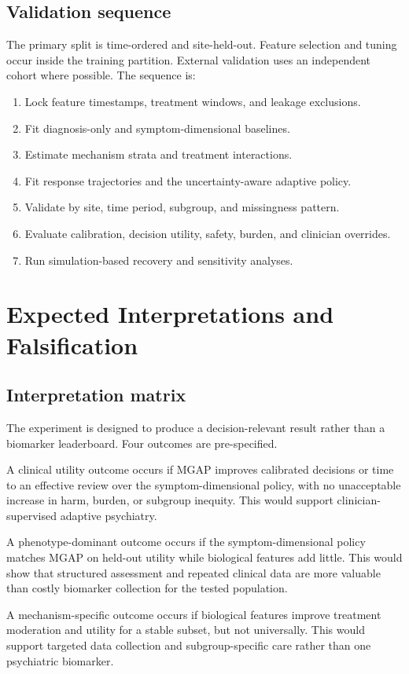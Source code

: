 \documentclass[conference]{IEEEtran}
\begin{document}
\subsection{Validation sequence}
The primary split is time-ordered and site-held-out. Feature selection and tuning occur inside the training partition. External validation uses an independent cohort where possible. The sequence is:
\begin{enumerate}
\item Lock feature timestamps, treatment windows, and leakage exclusions.
\item Fit diagnosis-only and symptom-dimensional baselines.
\item Estimate mechanism strata and treatment interactions.
\item Fit response trajectories and the uncertainty-aware adaptive policy.
\item Validate by site, time period, subgroup, and missingness pattern.
\item Evaluate calibration, decision utility, safety, burden, and clinician overrides.
\item Run simulation-based recovery and sensitivity analyses.
\end{enumerate}

\section{Expected Interpretations and Falsification}
\subsection{Interpretation matrix}
The experiment is designed to produce a decision-relevant result rather than a biomarker leaderboard. Four outcomes are pre-specified.

A clinical utility outcome occurs if MGAP improves calibrated decisions or time to an effective review over the symptom-dimensional policy, with no unacceptable increase in harm, burden, or subgroup inequity. This would support clinician-supervised adaptive psychiatry.

A phenotype-dominant outcome occurs if the symptom-dimensional policy matches MGAP on held-out utility while biological features add little. This would show that structured assessment and repeated clinical data are more valuable than costly biomarker collection for the tested population.

A mechanism-specific outcome occurs if biological features improve treatment moderation and utility for a stable subset, but not universally. This would support targeted data collection and subgroup-specific care rather than one psychiatric biomarker.
\end{document}
